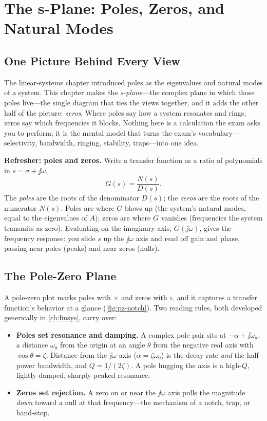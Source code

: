 \chapter{The s-Plane: Poles, Zeros, and Natural Modes}
\label{ch:splane}
\section{One Picture Behind Every View}
The linear-systems chapter introduced poles as the eigenvalues and natural modes
of a system. This chapter makes the \emph{s-plane}---the complex plane in which
those poles live---the single diagram that ties the views together, and it adds
the other half of the picture: \emph{zeros}. Where poles say how a system
resonates and rings, zeros say which frequencies it blocks. Nothing here is a
calculation the exam asks you to perform; it is the mental model that turns the
exam's vocabulary---selectivity, bandwidth, ringing, stability, traps---into one
idea.

\begin{controlsbox}
\textbf{Refresher: poles and zeros.} Write a transfer function as a ratio of
polynomials in \(s=\sigma+\jj\omega\),
\[
G(s)=\frac{N(s)}{D(s)}.
\]
The \emph{poles} are the roots of the denominator \(D(s)\); the \emph{zeros} are
the roots of the numerator \(N(s)\). Poles are where \(G\) blows up (the system's
natural modes, equal to the eigenvalues of \(A\)); zeros are where \(G\) vanishes
(frequencies the system transmits as zero). Evaluating on the imaginary axis,
\(G(\jj\omega)\), gives the frequency response: you slide \(s\) up the
\(\jj\omega\) axis and read off gain and phase, passing near poles (peaks) and
near zeros (nulls).
\end{controlsbox}

\section{The Pole-Zero Plane}
A pole-zero plot marks poles with \(\times\) and zeros with \(\circ\), and it
captures a transfer function's behavior at a glance (\cref{fig:pz-notch}). Two
reading rules, both developed generically in \cref{ch:linsys}, carry over:
\begin{itemize}
\item \textbf{Poles set resonance and damping.} A complex pole pair sits at
\(-\alpha\pm\jj\omega_d\), a distance \(\omega_0\) from the origin at an angle
\(\theta\) from the negative real axis with \(\cos\theta=\zeta\). Distance from
the \(\jj\omega\) axis (\(\alpha=\zeta\omega_0\)) is the decay rate \emph{and} the
half-power bandwidth, and \(Q=1/(2\zeta)\). A pole hugging the axis is a high-\(Q\),
lightly damped, sharply peaked resonance.
\item \textbf{Zeros set rejection.} A zero on or near the \(\jj\omega\) axis
pulls the magnitude \emph{down} toward a null at that frequency---the mechanism of
a notch, trap, or band-stop.
\end{itemize}

